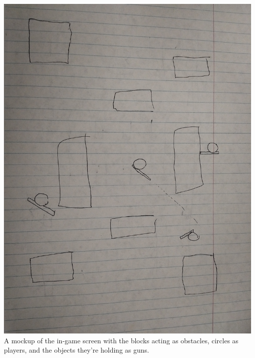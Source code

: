 \documentclass[11pt, oneside]{article}   	%
\begin{document}
\clearpage

\includegraphics[scale=.085]{mockup.jpg}\\
A mockup of the in-game screen with the blocks acting as obstacles, circles as players, and the objects they're holding as guns.
\end{document}
